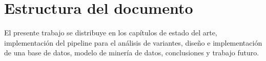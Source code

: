 \section*{Estructura del documento}

El presente trabajo se distribuye en los capítulos de estado del arte, implementación del pipeline para el análisis de variantes, diseño e implementación de una base de datos, modelo de minería de datos, conclusiones y trabajo futuro.

